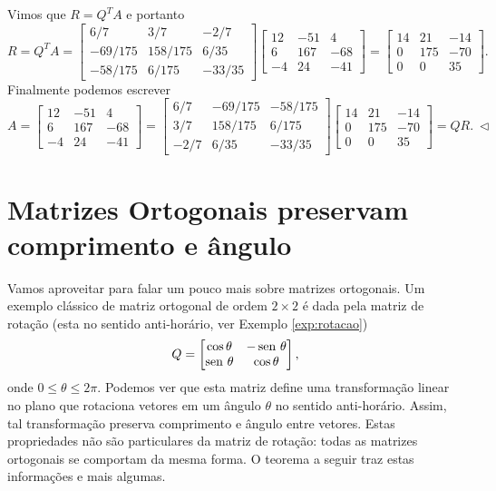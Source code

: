 Vimos que $R=Q^T A$ e portanto
\begin{equation}
R = Q^T A =
\begin{bmatrix}
6/7 & 3/7 & -2/7 \\
-69/175 & 158/175 & 6/35   \\
-58/175& 6/175   &-33/35
\end{bmatrix}
\begin{bmatrix}
12 & -51 & 4 \\
6 & 167 & -68 \\
-4 & 24 & -41
\end{bmatrix} =
\begin{bmatrix}
14&21&-14\\
0&175&-70\\
0&0&35
\end{bmatrix} .
\end{equation}
Finalmente podemos escrever
\begin{equation}
A =
\begin{bmatrix}
12 & -51 & 4 \\
6 & 167 & -68 \\
-4 & 24 & -41
\end{bmatrix} =
\begin{bmatrix}
6/7 & -69/175 & -58/175 \\
3/7 & 158/175 & 6/175   \\
-2/7& 6/35   &-33/35
\end{bmatrix}
\begin{bmatrix}
14&21&-14\\
0&175&-70\\
0&0&35
\end{bmatrix} = QR. \ \lhd
\end{equation}


\section{Matrizes Ortogonais preservam comprimento e ângulo}

Vamos aproveitar para falar um pouco mais sobre matrizes ortogonais. Um exemplo clássico de matriz ortogonal de ordem $2\times 2$ é dada pela matriz de rotação (esta no sentido anti-horário, ver Exemplo \ref{exp:rotacao})
\begin{equation}
Q =
\begin{bmatrix}
\cos \theta & -\operatorname{sen}\, \theta \\
\operatorname{sen}\, \theta & \cos \theta
\end{bmatrix} ,\end{equation}
onde $0 \leq \theta \leq 2 \pi$.
Podemos ver que esta matriz define uma transformação linear no plano que rotaciona vetores em um ângulo $\theta$ no sentido anti-horário.
Assim, tal transformação preserva comprimento e ângulo entre vetores.
Estas propriedades não são particulares da matriz de rotação: todas as matrizes ortogonais se comportam da mesma forma. O teorema a seguir traz estas informações e mais algumas.

